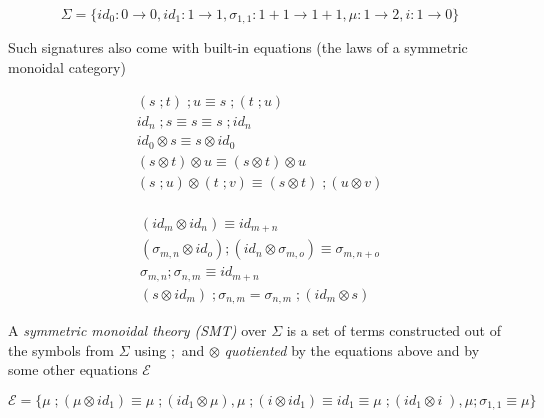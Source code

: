\documentclass[aspectratio=169]{beamer}
\begin{document}
\begin{frame}{}
  
\small

\[
\Sigma = \{id_0 : 0 \to 0, id_{1} : 1 \to 1, \sigma_{1,1} : 1 + 1 \to 1 + 1,\mu : 1 \to 2, i : 1 \to 0\}
\]
 
Such signatures also come with \alert{built-in} equations (the laws of a symmetric monoidal category)


\begin{minipage}[c][][c]{0.45\textwidth}
\begin{align*}    
(s\;;t)\;;u \equiv s\;;(t\;;u)\\
id_{n}\;;s \equiv s \equiv s\;;id_{n}\\
id_{0} \otimes s \equiv s \otimes id_{0}\\
(s \otimes t) \otimes u \equiv (s \otimes t) \otimes u\\
(s\;;u) \otimes (t\;;v) \equiv (s \otimes t)\;;(u \otimes v)\\
\end{align*}
\end{minipage}
\hfill
\begin{minipage}[c][][c]{0.45\textwidth}
\begin{align*}
(id_{m} \otimes id_{n}) \equiv id_{m + n}\\
(\sigma_{m,n} \otimes id_{o});(id_{n} \otimes \sigma_{m,o}) \equiv \sigma_{m,n+o}\\
\sigma_{m,n} ; \sigma_{n,m} \equiv id_{m+n}\\
(s \otimes id_{m})\;; \sigma_{n,m} = \sigma_{n,m}\;; (id_{m} \otimes s)
\end{align*}    
\end{minipage}

\end{frame}

\begin{frame}
    
    A \textit{symmetric monoidal theory (SMT)} over $\Sigma$ is a set of terms constructed out of the symbols from $\Sigma$ using $;$ and $\otimes$ \textit{quotiented} by the equations above and by some other equations $\mathcal{E}$

    \begin{example}
        \[
            \mathcal{E} = \{ \mu \;; (\mu \otimes id_{1}) \equiv \mu \;; (id_{1} \otimes \mu), \mu \;; (i \otimes id_{1}) \equiv id_{1} \equiv \mu\;;(id_{1} \otimes i\;), \mu;\sigma_{1,1} \equiv \mu \}  
        \]
    \end{example}

\end{frame}
\end{document}

